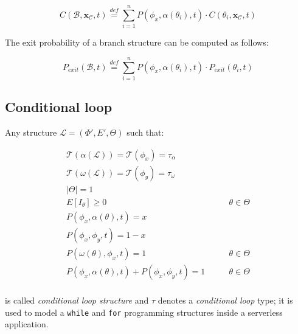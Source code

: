 \documentclass[12pt,a4paper]{report}
\newcommand{\mathDef}{\overset{\textit{def}}{=}}
\begin{document}
\begin{equation}
	C(\mathcal{B},\textbf{x}_{\mathcal{C}}, t) \mathDef \sum_{i = 1}^n P(\phi_{x}, \alpha(\theta_i),t) \cdot C(\theta_i,\textbf{x}_{\mathcal{C}}, t)
\end{equation}

The exit probability of a branch structure can be computed as follows:

\begin{equation}
	P_{exit}(\mathcal{B}, t) \mathDef \sum_{i = 1}^n P(\phi_{x}, \alpha(\theta_i),t) \cdot P_{exit}(\theta_i, t)
\end{equation}

\subsection{Conditional loop}

Any structure $\mathcal{L} = (\Phi',E',\Theta)$ such that:

\begin{eqnarray}
	\mathscr{T}(\alpha(\mathcal{L})) = \mathscr{T}(\phi_x) = \tau_{\alpha} \\ \mathscr{T}(\omega(\mathcal{L})) = \mathscr{T}(\phi_y) = \tau_{\omega} \\
	|\Theta| = 1  & \\
	E[I_{\theta}] \geq 0 & \qquad \theta \in \Theta \\
	P(\phi_{x}, \alpha(\theta), t) = x & \\
	P(\phi_{x}, \phi_{y},t) = 1 - x & \\
	P(\omega(\theta), \phi_{x},t) = 1 & \qquad \theta \in \Theta \\
	P(\phi_x, \alpha(\theta),t) + P(\phi_{x}, \phi_{y},t) = 1 & \qquad \theta \in \Theta \\
\end{eqnarray}

is called \textit{conditional loop structure} and $\tau$ denotes a \textit{conditional loop} type; it is used to model a \texttt{while} and \texttt{for} programming structures inside a serverless application. 
\end{document}
